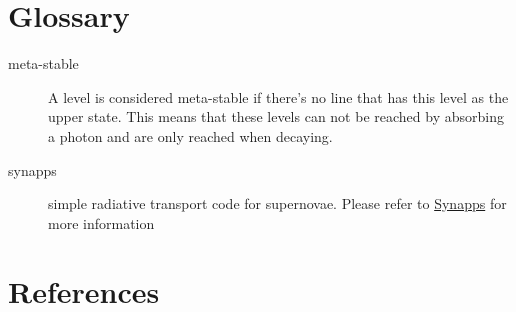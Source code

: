 \documentclass[letterpaper,10pt,english]{sphinxmanual}
\begin{document}
\chapter{Glossary}
\label{glossary:glossary}\label{glossary::doc}\begin{description}
\item[{meta-stable}] \leavevmode{}\label{glossary:term-meta-stable}
A level is considered meta-stable if there's no line that has this level as the upper state. This means
that these levels can not be reached by absorbing a photon and are only reached when decaying.

\item[{synapps}] \leavevmode{}\label{glossary:term-synapps}
simple radiative transport code for supernovae. Please refer to \href{https://c3.lbl.gov/es/}{Synapps} for more
information

\end{description}


\chapter{References}
\label{zreferences:references}\label{zreferences::doc}


\begin{thebibliography}{1}
\end{thebibliography}



\renewcommand{\indexname}{Index}
\printindex
\end{document}
